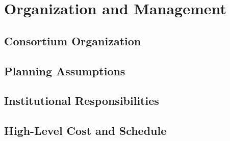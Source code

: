 \section{Organization and Management}
\label{sec:fdsp-tpcelec-management}

\subsection{Consortium Organization}
\label{sec:fdsp-tpcelec-management-consort}

\subsection{Planning Assumptions}
\label{sec:fdsp-tpcelec-management-planning}

\subsection{Institutional Responsibilities}
\label{sec:fdsp-tpcelec-management-resp}

\subsection{High-Level Cost and Schedule}
\label{sec:fdsp-tpcelec-management-cost}
